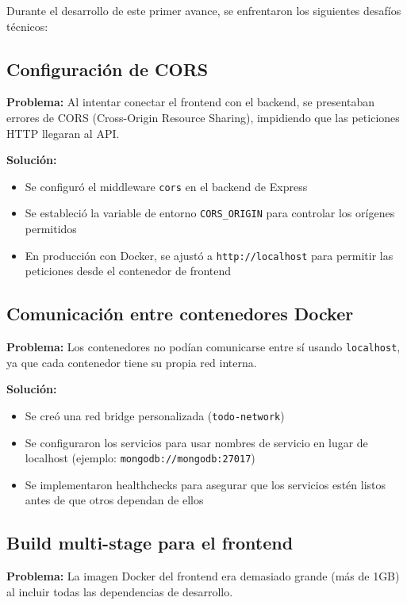 \documentclass[12pt,a4paper]{article}
\begin{document}
Durante el desarrollo de este primer avance, se enfrentaron los siguientes desafíos técnicos:

\subsection{Configuración de CORS}

\textbf{Problema:} Al intentar conectar el frontend con el backend, se presentaban errores de CORS (Cross-Origin Resource Sharing), impidiendo que las peticiones HTTP llegaran al API.

\textbf{Solución:} 
\begin{itemize}
    \item Se configuró el middleware \texttt{cors} en el backend de Express
    \item Se estableció la variable de entorno \texttt{CORS\_ORIGIN} para controlar los orígenes permitidos
    \item En producción con Docker, se ajustó a \texttt{http://localhost} para permitir las peticiones desde el contenedor de frontend
\end{itemize}

\subsection{Comunicación entre contenedores Docker}

\textbf{Problema:} Los contenedores no podían comunicarse entre sí usando \texttt{localhost}, ya que cada contenedor tiene su propia red interna.

\textbf{Solución:}
\begin{itemize}
    \item Se creó una red bridge personalizada (\texttt{todo-network})
    \item Se configuraron los servicios para usar nombres de servicio en lugar de localhost (ejemplo: \texttt{mongodb://mongodb:27017})
    \item Se implementaron healthchecks para asegurar que los servicios estén listos antes de que otros dependan de ellos
\end{itemize}

\subsection{Build multi-stage para el frontend}

\textbf{Problema:} La imagen Docker del frontend era demasiado grande (más de 1GB) al incluir todas las dependencias de desarrollo.
\end{document}
